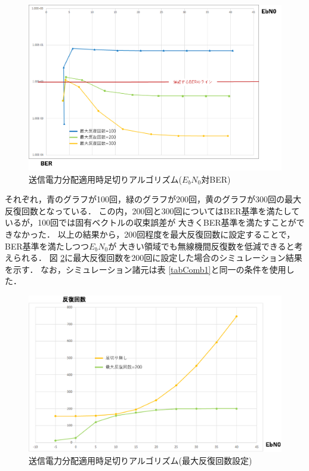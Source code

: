\begin{figure}[h]
    \centering
    \includegraphics[width=0.95\linewidth]{chapter4/figure/CombSim3.eps}
    \caption{送信電力分配適用時足切りアルゴリズム($E_bN_0$対BER)}
    \label{figCombSim3}
\end{figure}

それぞれ，青のグラフが100回，緑のグラフが200回，黄のグラフが300回の最大反復回数となっている．
この内，200回と300回についてはBER基準を満たしているが，100回では固有ベクトルの収束誤差が
大きくBER基準を満たすことができなかった．
以上の結果から，200回程度を最大反復回数に設定することで，BER基準を満たしつつ$E_bN_0$が
大きい領域でも無線機間反復数を低減できると考えられる．
図 \ref{figCombSim4}に最大反復回数を200回に設定した場合のシミュレーション結果を示す．
なお，シミュレーション諸元は表 \ref{tabComb1}と同一の条件を使用した．

\begin{figure}[h]
    \centering
    \includegraphics[width=0.95\linewidth]{chapter4/figure/CombSim4.eps}
    \caption{送信電力分配適用時足切りアルゴリズム(最大反復回数設定)}
    \label{figCombSim4}
\end{figure}

